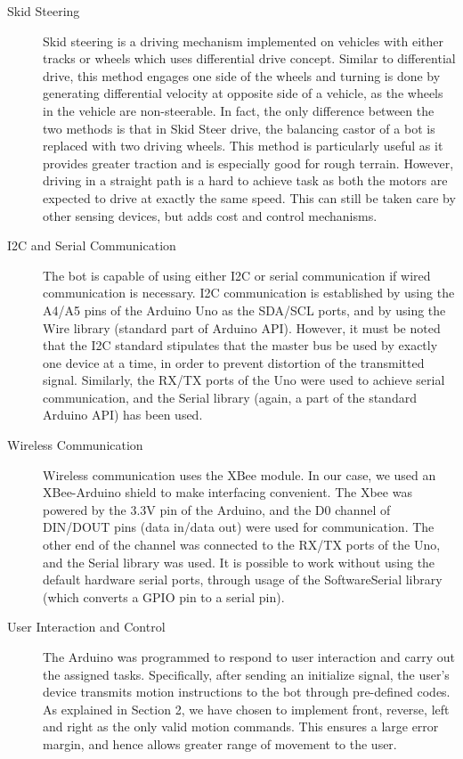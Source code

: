 \documentclass[a4paper]{article}
\begin{document}
\begin{description}
\item[Skid Steering] Skid steering is a driving mechanism implemented on vehicles with either tracks or wheels which uses differential drive concept. Similar to differential drive, this method engages one side of the wheels and turning is done by generating differential velocity at opposite side of a vehicle, as the wheels in the vehicle are non-steerable. In fact, the only difference between the two methods is that in Skid Steer drive, the balancing castor of a bot is replaced with two driving wheels. This method is particularly useful as it provides greater traction and is especially good for rough terrain. However, driving in a straight path is a hard to achieve task as both the motors are expected to drive at exactly the same speed. This can still be taken care by other sensing devices, but adds cost and control mechanisms.

\item[I2C and Serial Communication] The bot is capable of using either I2C or serial communication if wired communication is necessary. I2C communication is established by using the A4/A5 pins of the Arduino Uno as the SDA/SCL ports, and by using the Wire library (standard part of Arduino API). However, it must be noted that the I2C standard stipulates that the master bus be used by exactly one device at a time, in order to prevent distortion of the transmitted signal. Similarly, the RX/TX ports of the Uno were used to achieve serial communication, and the Serial library (again, a part of the standard Arduino API) has been used.

\item[Wireless Communication] Wireless communication uses the XBee module. In our case, we used an XBee-Arduino shield to make interfacing convenient. The Xbee was powered by the 3.3V pin of the Arduino, and the D0 channel of DIN/DOUT pins (data in/data out) were used for communication. The other end of the channel was connected to the RX/TX ports of the Uno, and the Serial library was used. It is possible to work without using the default hardware serial ports, through usage of the SoftwareSerial library (which converts a GPIO pin to a serial pin).

\item[User Interaction and Control] The Arduino was programmed to respond to user interaction and carry out the assigned tasks. Specifically, after sending an initialize signal, the user's device transmits motion instructions to the bot through pre-defined codes. As explained in Section 2, we have chosen to implement front, reverse, left and right as the only valid motion commands. This ensures a large error margin, and hence allows greater range of movement to the user.
\end{description}
\end{document}
